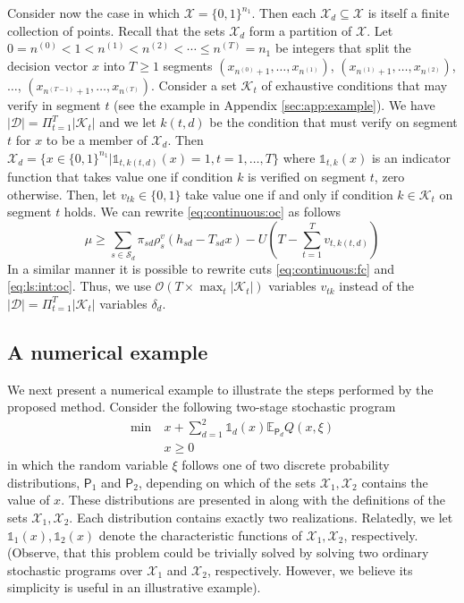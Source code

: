 \documentclass[12pt]{article}
\theoremstyle{thmstylethree}%
\newcommand{\mtc}[1] {\mathcal{#1}}
\newcommand{\pr}[1]{\ensuremath{\mathsf{#1}}}
\def\Ex{\ensuremath{\mathbb{E}}}
\def\Ind{\ensuremath{\mathbb{1}}}
\begin{document}
Consider now the case in which $\mtc{X}=\{0,1\}^{n_1}$.
Then each $\mtc{X}_d\subseteq\mtc{X}$ is itself a finite collection of points. Recall that the sets $\mtc{X}_d$ form a partition of $\mtc{X}$. Let $0=n^{(0)}<1<n^{(1)}<n^{(2)}<\cdots\leq n^{(T)}=n_1$ be integers that split the decision vector $x$ into $T\geq 1$ segments $(x_{n^{(0)}+1},\ldots,x_{n^{(1)}})$, $(x_{n^{(1)}+1},\ldots,x_{n^{(2)}})$, $\ldots$, $(x_{n^{(T-1)}+1},\ldots,x_{n^{(T)}})$. 
Consider a set $\mtc{K}_t$ of exhaustive conditions that may verify in segment $t$ (see the example in Appendix \ref{sec:app:example}). We have $|\mtc{D}|=\Pi_{t=1}^T|\mtc{K}_t|$ and we let $k(t,d)$ be the condition that must verify on segment $t$ for $x$ to be a member of  $\mtc{X}_d$. 
Then $\mtc{X}_d=\{x\in\{0,1\}^{n_1}|\Ind_{t,k(t,d)}(x)=1, t=1,\ldots,T\}$ where $\Ind_{t,k}(x)$ is an indicator function that takes value one if condition $k$ is verified on segment $t$, zero otherwise.
Then, let $v_{tk}\in\{0,1\}$ take value one if and only if condition $k\in\mtc{K}_t$ on segment $t$ holds. We can rewrite \eqref{eq:continuous:oc} as follows
$$\mu\geq \sum_{s\in\mtc{S}_d}\pi_{sd}\rho^v_s(h_{sd}-T_{sd}x) - U\left(T-\sum_{t=1}^Tv_{t,k(t,d)}\right)$$
In a similar manner it is possible to rewrite cuts \eqref{eq:continuous:fc} and \eqref{eq:ls:int:oc}. Thus, we use $\mtc{O}(T\times \max_{t}|\mtc{K}_t|)$ variables $v_{tk}$ instead of the $|\mtc{D}|=\Pi_{t=1}^T|\mtc{K}_t|$ variables $\delta_d$.

\subsection{A numerical example}
We next present a numerical example to illustrate the steps performed by the proposed method. %
Consider the following two-stage stochastic program
  \begin{align*}
    \min~ & x+\sum_{d=1}^2\Ind_d(x)\Ex_{\pr{P}_d}Q(x,\xi)\\
    &x\geq 0
  \end{align*}
  in which the random variable $\xi$ follows one of two discrete probability distributions, $\pr{P}_1$ and $\pr{P}_2$, depending on which of the sets $\mtc{X}_1,\mtc{X}_2$ contains the value of $x.$ These distributions are presented in  along with the definitions of the sets $\mtc{X}_1,\mtc{X}_2.$ Each distribution contains exactly two realizations. Relatedly, we  let $\Ind_1(x), \Ind_2(x)$ denote the characteristic functions of $\mtc{X}_1,\mtc{X}_2$, respectively. (Observe, that this problem could be trivially solved by solving two ordinary stochastic programs over $\mtc{X}_1$ and $\mtc{X}_2$, respectively. However, we believe its simplicity is useful in an illustrative example).
\end{document}
